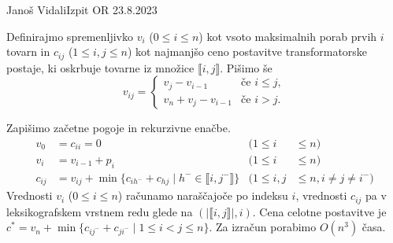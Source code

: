 \begin{naloga}{Janoš Vidali}{Izpit OR 23.8.2023}
\begin{odgovor}
\begin{enumerate}[(a)]
Definirajmo spremenljivko $v_i$ ($0 \le i \le n$)
kot vsoto maksimalnih porab prvih $i$ tovarn
in $c_{ij}$ ($1 \le i, j \le n$)
kot najmanjšo ceno postavitve transformatorske postaje,
ki oskrbuje tovarne iz množice $\llbracket i, j \rrbracket$.
Pišimo še
$$
v_{ij} = \begin{cases}
v_j - v_{i-1} & \text{če $i \le j$}, \\
v_n + v_j - v_{i-1} & \text{če $i > j$}.
\end{cases}
$$

Zapišimo začetne pogoje in rekurzivne enačbe.
\begin{align*}
v_0 &= c_{ii} = 0 & (1 \le i &\le n) \\
v_i &= v_{i-1} + p_i & (1 \le i &\le n) \\
c_{ij} &= v_{ij} + \min\{c_{ih^-} + c_{hj} \mid h^- \in \llbracket i, j^- \rrbracket\}
 & (1 \le i, j &\le n, i \ne j \ne i^-)
\end{align*}
Vrednosti $v_i$ ($0 \le i \le n$) računamo naraščajoče po indeksu $i$,
vrednosti $c_{ij}$ pa v leksikografskem vrstnem redu
glede na $(|\llbracket i, j \rrbracket|, i)$.
Cena celotne postavitve je
$c^* = v_n + \min\{c_{ij^-} + c_{ji^-} \mid 1 \le i < j \le n\}$.
Za izračun porabimo $O(n^3)$ časa.


\end{enumerate}
\end{odgovor}
\end{naloga}
